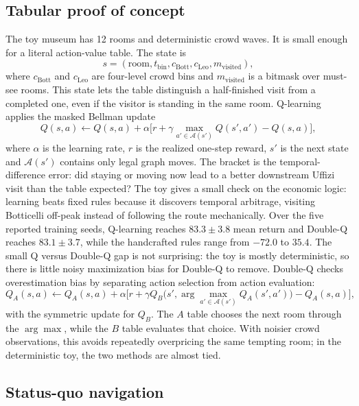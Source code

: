 \documentclass[11pt]{article}
\newcommand{\Acal}{\mathcal{A}}
\newenvironment{addedblock}{\begingroup\color{green!50!black}}{\endgroup}
\begin{document}
\subsection{Tabular proof of concept}

The toy museum has 12 rooms and deterministic crowd waves. It is small enough for a literal
action-value table. The state is
\[
s=(\text{room},t_{\text{bin}},c_{\text{Bott}},c_{\text{Leo}},m_{\text{visited}}),
\]
where $c_{\text{Bott}}$ and $c_{\text{Leo}}$ are four-level crowd bins and
$m_{\text{visited}}$ is a bitmask over must-see rooms. This state lets the table distinguish a
half-finished visit from a completed one, even if the visitor is standing in the same room. Q-learning applies the masked Bellman update
\[
Q(s,a)\leftarrow Q(s,a)+\alpha\Big[
r+\gamma\max_{a'\in \Acal(s')}Q(s',a')-Q(s,a)\Big],
\]
where $\alpha$ is the learning rate, $r$ is the realized one-step reward, $s'$ is the next state and
$\Acal(s')$ contains only legal graph moves. The bracket is the temporal-difference error: did
staying or moving now lead to a better downstream Uffizi visit than the table expected? The toy gives
a small check on the economic logic: learning beats fixed rules because it discovers temporal
arbitrage, visiting Botticelli off-peak instead of following the route mechanically. Over the five reported training seeds, Q-learning
reaches $83.3\pm3.8$ mean return and Double-Q reaches $83.1\pm3.7$, while the handcrafted rules range
from $-72.0$ to $35.4$. The small Q versus Double-Q gap is not surprising: the toy is mostly
deterministic, so there is little noisy maximization bias for Double-Q to remove.
\begin{addedblock}
Double-Q checks overestimation bias by separating action selection from action evaluation:
\[
Q_A(s,a)\leftarrow Q_A(s,a)+\alpha\Big[
r+\gamma Q_B\big(s',\arg\max_{a'\in\Acal(s')}Q_A(s',a')\big)-Q_A(s,a)\Big],
\]
with the symmetric update for $Q_B$.
The $A$ table chooses the next room through the $\arg\max$, while the $B$ table evaluates that choice.
With noisier crowd observations, this avoids repeatedly overpricing the same tempting room; in
the deterministic toy, the two methods are almost tied.
\end{addedblock}

\subsection{Status-quo navigation}
\end{document}
